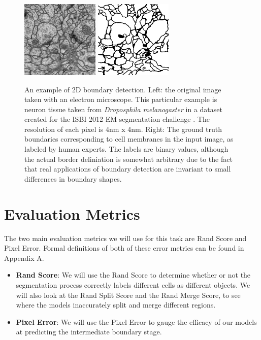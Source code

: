 \begin{figure}
    \centering
	\includegraphics[width=0.33\textwidth]{img/isbi_raw_example}
	\hspace{1cm}
	\includegraphics[width=0.33\textwidth]{img/isbi_label_example}
    \caption[An example of 2D boundary detection]{An example of 2D boundary detection. Left: the original image taken with an electron microscope. This particular example is neuron tissue taken from \textit{Droposphila melanogaster} in a dataset created for the ISBI 2012 EM segmentation challenge \cite{Arganda-Carreras2015}. The resolution of each pixel is 4nm x 4nm. Right: The ground truth boundaries corresponding to cell membranes in the input image, as labeled by human experts. The labels are binary values, although the actual border deliniation is somewhat arbitrary due to the fact that real applications of boundary detection are invariant to small differences in boundary shapes.}
    \label{fig:isbi_example}
\end{figure}

\section{Evaluation Metrics}

The two main evaluation metrics we will use for this task are Rand Score and Pixel Error. Formal definitions of both of these error metrics can be found in Appendix A. 

\begin{itemize}
\item \textbf{Rand Score}: We will use the Rand Score to determine whether or not the segmentation process correctly labels different cells as different objects. We will also look at the Rand Split Score and the Rand Merge Score, to see where the models inaccurately split and merge different regions.
\item \textbf{Pixel Error}: We will use the Pixel Error to gauge the efficacy of our models at predicting the intermediate boundary stage.
\end{itemize}


